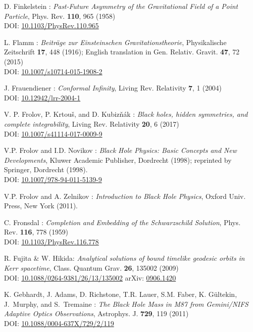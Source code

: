 \begin{thebibliography}{123}
D. Finkelstein :
{\em Past-Future Asymmetry of the Gravitational Field of a Point Particle},
Phys. Rev. {\bf 110}, 965 (1958)\\
DOI: \href{https://doi.org/10.1103/PhysRev.110.965}{10.1103/PhysRev.110.965}

L. Flamm : {\em Beiträge zur Einsteinschen Gravitationstheorie},
Physikalische Zeitschrift {\bf 17}, 448 (1916); English translation in
Gen. Relativ. Gravit. {\bf 47}, 72 (2015)\\
DOI: \href{https://doi.org/10.1007/s10714-015-1908-2}{10.1007/s10714-015-1908-2}

J. Frauendiener :
{\em Conformal Infinity},
Living Rev. Relativity {\bf 7}, 1 (2004) \\
DOI: \href{https://doi.org/10.12942/lrr-2004-1}{10.12942/lrr-2004-1}

V. P. Frolov, P. Krtouš, and D. Kubizňák :
{\em Black holes, hidden symmetries, and complete integrability},
Living Rev. Relativity {\bf 20}, 6 (2017) \\
DOI: \href{https://doi.org/10.1007/s41114-017-0009-9}{10.1007/s41114-017-0009-9}

V.P. Frolov and I.D. Novikov : {\em Black Hole Physics:
Basic Concepts and New Developments},
Kluwer Academic Publisher, Dordrecht (1998); reprinted by
Springer, Dordrecht (1998). \\
DOI: \href{https://doi.org/10.1007/978-94-011-5139-9}{10.1007/978-94-011-5139-9}

V.P. Frolov and A. Zelnikov : {\em Introduction to Black Hole Physics},
Oxford Univ. Press, New York (2011).

C. Fronsdal : {\em Completion and Embedding of the Schwarzschild Solution},
Phys. Rev. {\bf 116}, 778 (1959) \\
DOI: \href{https://doi.org/10.1103/PhysRev.116.778}{10.1103/PhysRev.116.778}

R. Fujita \& W. Hikida:
{\em Analytical solutions of bound timelike geodesic orbits in Kerr spacetime},
Class. Quantum Grav. {\bf 26}, 135002 (2009) \\
DOI: \href{https://doi.org/10.1088/0264-9381/26/13/135002}{10.1088/0264-9381/26/13/135002}\hfill
arXiv: \href{https://arxiv.org/abs/0906.1420}{0906.1420}

K. Gebhardt, J. Adams, D. Richstone, T.R. Lauer, S.M. Faber, K. Gültekin, J.~Murphy, and S.~Tremaine :
{\em The Black Hole Mass in M87 from Gemini/NIFS Adaptive Optics Observations},
Astrophys. J. {\bf 729}, 119 (2011)\\
DOI: \href{https://doi.org/10.1088/0004-637X/729/2/119}{10.1088/0004-637X/729/2/119}


\end{thebibliography}
